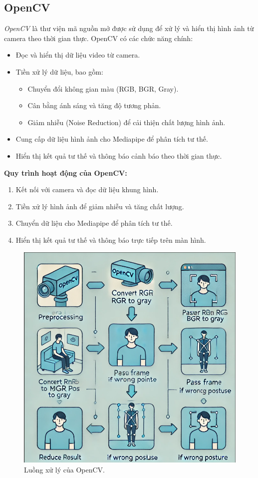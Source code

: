 \documentclass[journal,onecolumn]{IEEEtran}
\begin{document}
\subsection{\textbf{OpenCV}}
\textit{OpenCV} là thư viện mã nguồn mở được sử dụng để xử lý và hiển thị hình ảnh từ camera theo thời gian thực. OpenCV có các chức năng chính:
\begin{itemize}
    \item Đọc và hiển thị dữ liệu video từ camera.
    \item Tiền xử lý dữ liệu, bao gồm:
    \begin{itemize}
        \item Chuyển đổi không gian màu (RGB, BGR, Gray).
        \item Cân bằng ánh sáng và tăng độ tương phản.
        \item Giảm nhiễu (Noise Reduction) để cải thiện chất lượng hình ảnh.
    \end{itemize}
    \item Cung cấp dữ liệu hình ảnh cho Mediapipe để phân tích tư thế.
    \item Hiển thị kết quả tư thế và thông báo cảnh báo theo thời gian thực.
\end{itemize}

\textbf{Quy trình hoạt động của OpenCV:}
\begin{enumerate}
    \item Kết nối với camera và đọc dữ liệu khung hình.
    \item Tiền xử lý hình ảnh để giảm nhiễu và tăng chất lượng.
    \item Chuyển dữ liệu cho Mediapipe để phân tích tư thế.
    \item Hiển thị kết quả tư thế và thông báo trực tiếp trên màn hình.
\end{enumerate}

\begin{figure}[H]
    \centering
    \includegraphics[width=0.7\linewidth]{images/opencv_workflow.png}
    \caption{Luồng xử lý của OpenCV.}
    \label{fig:opencv_workflow}
\end{figure}
\end{document}
